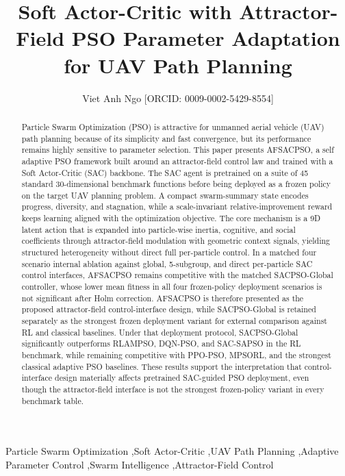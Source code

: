 \documentclass[final,5p,times]{elsarticle}
\providecommand{\orcid}[1]{\texorpdfstring{\,\href{https://orcid.org/#1}{\textcolor{ElsevierBlue}{\small[ORCID:\,#1]}}}{ [ORCID: #1]}}
\def\orcid#1{ [ORCID: #1]}%
\def\textcolor#1#2{#2}%
\def\small{}%
\begin{document}
\begin{frontmatter}
\title{Soft Actor-Critic with Attractor-Field PSO Parameter Adaptation for UAV Path Planning}
\author[aff1]{Viet Anh Ngo\orcid{0009-0002-5429-8554}}
\address[aff1]{School of Mechanical Engineering, Hanoi University of Science and Technology, No.~1 Dai Co Viet Road, Hai Ba Trung District, Hanoi, Vietnam}
\begin{abstract}
Particle Swarm Optimization (PSO) is attractive for unmanned aerial vehicle (UAV) path planning because of its simplicity and fast convergence, but its performance remains highly sensitive to parameter selection.
This paper presents AFSACPSO, a self adaptive PSO framework built around an attractor-field control law and trained with a Soft Actor-Critic (SAC) backbone.
The SAC agent is pretrained on a suite of 45 standard 30-dimensional benchmark functions before being deployed as a frozen policy on the target UAV planning problem.
A compact swarm-summary state encodes progress, diversity, and stagnation, while a scale-invariant relative-improvement reward keeps learning aligned with the optimization objective.
The core mechanism is a 9D latent action that is expanded into particle-wise inertia, cognitive, and social coefficients through attractor-field modulation with geometric context signals, yielding structured heterogeneity without direct full per-particle control.
In a matched four scenario internal ablation against global, 5-subgroup, and direct per-particle SAC control interfaces, AFSACPSO remains competitive with the matched SACPSO-Global controller, whose lower mean fitness in all four frozen-policy deployment scenarios is not significant after Holm correction.
AFSACPSO is therefore presented as the proposed attractor-field control-interface design, while SACPSO-Global is retained separately as the strongest frozen deployment variant for external comparison against RL and classical baselines.
Under that deployment protocol, SACPSO-Global significantly outperforms RLAMPSO, DQN-PSO, and SAC-SAPSO in the RL benchmark, while remaining competitive with PPO-PSO, MPSORL, and the strongest classical adaptive PSO baselines.
These results support the interpretation that control-interface design materially affects pretrained SAC-guided PSO deployment, even though the attractor-field interface is not the strongest frozen-policy variant in every benchmark table.

\end{abstract}
\begin{keyword}
Particle Swarm Optimization \sep Soft Actor-Critic \sep UAV Path Planning \sep Adaptive Parameter Control \sep Swarm Intelligence \sep Attractor-Field Control
\end{keyword}
\end{frontmatter} 
\end{document}
